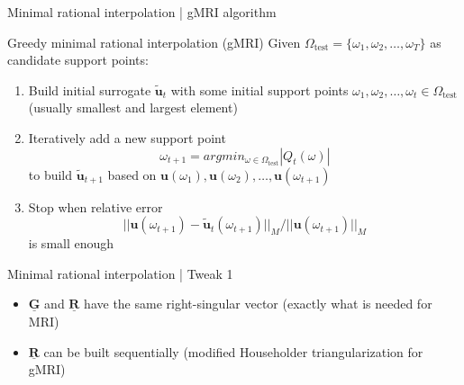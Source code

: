 \documentclass{beamer}
\begin{document}
\begin{frame}{Minimal rational interpolation | gMRI algorithm}
    
    \begin{block}{Greedy minimal rational interpolation (gMRI)}
        Given $\Omega_{\text{test}} = \{\omega_1, \omega_2, \dots, \omega_T\}$ as candidate support points:
        \begin{enumerate}
            \item<1-> Build initial surrogate $\mathbf{\tilde{u}}_{t}$ with some initial support points $\omega_1, \omega_2, \dots, \omega_t \in \Omega_{\text{test}}$ (usually smallest and largest element)
            \item<2-> Iteratively add a new support point
            \begin{equation*}
                \omega_{t+1} = argmin_{\omega \in \Omega_{\text{test}}} |Q_t(\omega)|
            \end{equation*}
            to build $\mathbf{\tilde{u}}_{t+1}$ based on $\mathbf{u}(\omega_1),
            \mathbf{u}(\omega_2), \dots, \mathbf{u}(\omega_{t+1})$
            \item<3-> Stop when relative error 
            \begin{equation*}
                ||\mathbf{u}(\omega_{t+1}) - \mathbf{\tilde{u}}_{t}(\omega_{t+1})||_M / ||\mathbf{u}(\omega_{t+1})||_M
            \end{equation*}
            is small enough
        \end{enumerate}
    \end{block}

\end{frame}

\begin{frame}{Minimal rational interpolation | Tweak 1}
    
    \begin{itemize}
        \item<2-> $\mathbf{\underline{G}}$ and $\mathbf{\underline{R}}$ have
        the same right-singular vector (exactly what is needed for MRI)
        \item<3-> $\mathbf{\underline{R}}$ can be built sequentially (modified
        Householder triangularization for gMRI)
    \end{itemize}
    
\end{frame}
\end{document}
